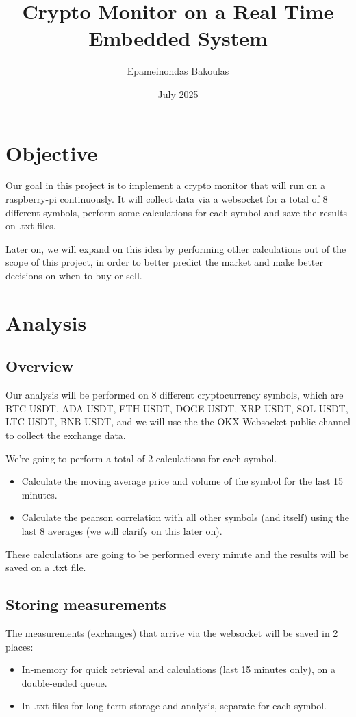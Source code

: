 \documentclass{article}
\title{Crypto Monitor on a Real Time Embedded System}
\author{Epameinondas Bakoulas}
\date{July 2025}
\begin{document}
\maketitle

\section{Objective}
Our goal in this project is to implement a crypto monitor that will run on a raspberry-pi continuously.
It will collect data via a websocket for a total of 8 different symbols, perform some calculations for
each symbol and save the results on .txt files.

Later on, we will expand on this idea by performing other calculations out of the scope of this project,
in order to better predict the market and make better decisions on when to buy or sell.

\section{Analysis}

\subsection{Overview}
Our analysis will be performed on 8 different cryptocurrency symbols, which are
BTC-USDT, ADA-USDT, ETH-USDT, DOGE-USDT, XRP-USDT, SOL-USDT, LTC-USDT, BNB-USDT, and 
we will use the the OKX Websocket public channel to collect the exchange data.

We're going to perform a total of 2 calculations for each symbol.
\begin{itemize}
    \item Calculate the moving average price and volume of the symbol for the last 15 minutes.
    \item Calculate the pearson correlation with all other symbols (and itself) using the last 8 averages (we will clarify on this later on).
\end{itemize}

These calculations are going to be performed every minute and the results will be saved on a .txt file.

\subsection{Storing measurements}
The measurements (exchanges) that arrive via the websocket will be saved in 2 places:
\begin{itemize}
    \item In-memory for quick retrieval and calculations (last 15 minutes only), on a double-ended queue.
    \item In .txt files for long-term storage and analysis, separate for each symbol.
\end{itemize}
\end{document}
